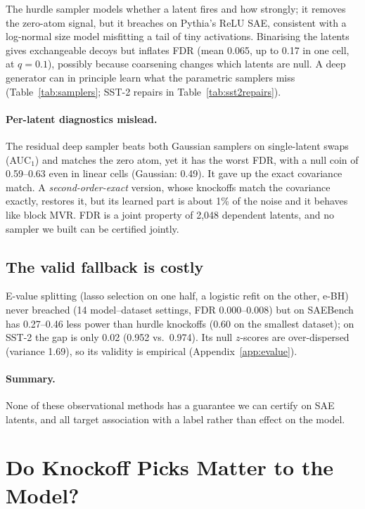 The hurdle sampler \citep{mullahy1986specification} models whether a latent fires and how strongly; it
removes the zero-atom signal, but it breaches on Pythia's ReLU SAE, consistent with a log-normal size model
misfitting a tail of tiny activations. Binarising the latents gives exchangeable decoys but inflates FDR (mean 0.065, up to 0.17 in one cell, at
$q = 0.1$), possibly because coarsening changes which latents are null. A deep generator
\citep{romano2020deep} can in principle learn what the parametric samplers miss (Table~\ref{tab:samplers}; SST-2
repairs in Table~\ref{tab:sst2repairs}).

\paragraph{Per-latent diagnostics mislead.} The residual deep sampler beats both Gaussian samplers on single-latent swaps (AUC$_1$) and
matches the zero atom, yet it has the worst FDR, with a null coin of 0.59--0.63 even in linear cells
(Gaussian: 0.49). It gave up the exact covariance match. A \emph{second-order-exact} version, whose knockoffs match the covariance exactly, restores it, but its learned part is
about 1\% of the noise and it behaves like block MVR. FDR is a joint property of 2,048 dependent latents,
and no sampler we built can be certified jointly.

\subsection{The valid fallback is costly}
\label{sec:evalue-obs}

E-value splitting (lasso selection on one half, a logistic refit on the other, e-BH) never breached
(14 model--dataset settings, FDR 0.000--0.008) but on SAEBench has 0.27--0.46 less power than hurdle knockoffs (0.60 on the smallest dataset); on SST-2 the gap is only 0.02 (0.952 vs.\ 0.974).
Its null $z$-scores are over-dispersed (variance 1.69), so its validity is empirical
(Appendix~\ref{app:evalue}).

\paragraph{Summary.} None of these observational methods has a guarantee we can certify on SAE latents, and all target
association with a label rather than effect on the model.

\section{Do Knockoff Picks Matter to the Model?}
\label{sec:downstream}


